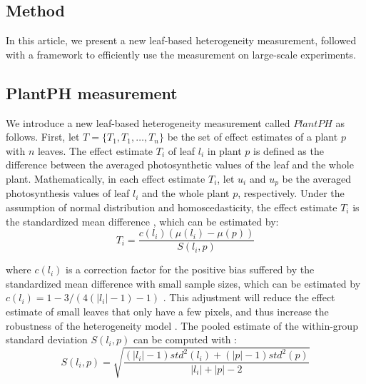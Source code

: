 \documentclass{bioinfo}
\begin{document}
\begin{methods}\vspace{-0.2in}
\section{Method}\label{sec:PlantPH}





In this article, we present a new leaf-based heterogeneity measurement, followed with a framework to efficiently use the measurement on large-scale experiments.

\subsection{PlantPH measurement}
We introduce a new leaf-based heterogeneity measurement called $PlantPH$ as follows.
%
First, let $T = \{T_{1}, T_{1}, \ldots, T_{n}\}$ be the set of effect estimates of a plant $p$ with $n$ leaves.
The effect estimate $T_{i}$ of leaf $l_i$ in plant $p$ is defined as the difference between the averaged photosynthetic values of the leaf and  the whole plant.
%
Mathematically, in each effect estimate $T_i$, let $u_i$ and $u_p$ be the averaged photosynthesis values of leaf $l_i$ and the whole plant $p$, respectively. Under the assumption of normal distribution and homoscedasticity, the effect estimate $T_i$ is the standardized mean difference \citep{hedges1998fixed}, which can be estimated by: %
%
\begin{equation}\label{eq:effectestimate}
T_{i} =  \frac{c(l_i)\left(\mu(l_i)-\mu(p)\right)}{S(l_i,p)}
\end{equation}

\noindent where $c(l_i)$ is a correction factor for the positive bias suffered by the standardized mean difference with small sample sizes, which can be estimated by $c(l_i) = 1-3/(4(|l_i|-1)-1)$ \citep{hedge1985statistical}. This adjustment will reduce the effect estimate of small leaves that only have a few pixels, and thus increase the robustness of the heterogeneity model \citep{huedo2006assessing}.
%
%
The pooled estimate of the within-group standard deviation $S(l_i, p)$ can be computed with \citep{hedges1998fixed}:
%
\begin{equation}\label{eq:S}
S(l_i, p) = \sqrt{\frac{(|l_i|-1)std^2(l_i)+(|p|-1)std^2(p)}{|l_i|+|p|-2}}
\end{equation}


\end{methods}
\end{document}
